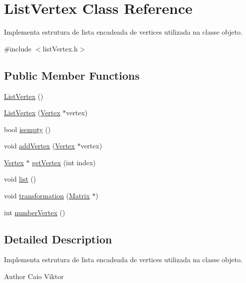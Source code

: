 \hypertarget{class_list_vertex}{\section{List\-Vertex Class Reference}
\label{class_list_vertex}
}


Implementa estrutura de lista encadeada de vertices utilizada na classe objeto.  




{\ttfamily \#include $<$list\-Vertex.\-h$>$}

\subsection*{Public Member Functions}
\begin{DoxyCompactItemize}
\item 
\hyperlink{class_list_vertex_ad02b1a3408d6495353a8f52aa9992512}{List\-Vertex} ()
\item 
\hyperlink{class_list_vertex_a3b3497a8b255b4269c544e559ae98ed8}{List\-Vertex} (\hyperlink{class_vertex}{Vertex} $\ast$vertex)
\item 
bool \hyperlink{class_list_vertex_a66a9b0150474a2feca5ee1af0f0da71e}{isempty} ()
\item 
void \hyperlink{class_list_vertex_abca9247ca574b717e21866341d66bf62}{add\-Vertex} (\hyperlink{class_vertex}{Vertex} $\ast$vertex)
\item 
\hyperlink{class_vertex}{Vertex} $\ast$ \hyperlink{class_list_vertex_a5cb7d5ae0c79a68f08866c4a2acbb214}{get\-Vertex} (int index)
\item 
void \hyperlink{class_list_vertex_aa3c13e6799b577aba2d86f4e29969a16}{list} ()
\item 
void \hyperlink{class_list_vertex_a0347466e8424c8ecf40cf8fa7d4b1f53}{transformation} (\hyperlink{class_matrix}{Matrix} $\ast$)
\item 
int \hyperlink{class_list_vertex_a0fa7cf40012232cceca046e43546620a}{number\-Vertex} ()
\end{DoxyCompactItemize}


\subsection{Detailed Description}
Implementa estrutura de lista encadeada de vertices utilizada na classe objeto. 

\begin{DoxyAuthor}{Author}
Caio Viktor 
\end{DoxyAuthor}


